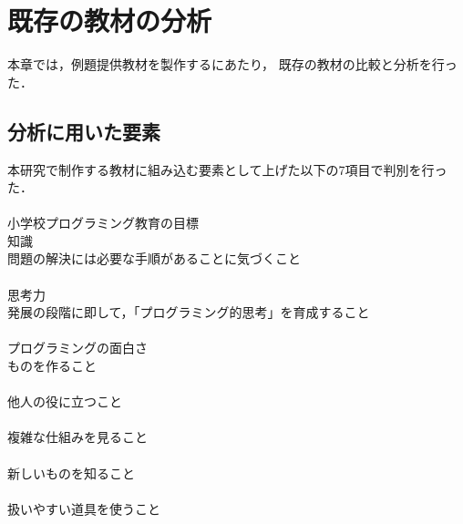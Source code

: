
\newpage

\section{\rm 既存の教材の分析}

本章では，例題提供教材を製作するにあたり， 既存の教材の比較と分析を行った．

\subsection{\rm 分析に用いた要素}
本研究で制作する教材に組み込む要素として上げた以下の7項目で判別を行った．\\\\
小学校プログラミング教育の目標\\
知識\\
問題の解決には必要な手順があることに気づくこと\\\\
思考力\\
発展の段階に即して，「プログラミング的思考」を育成すること\\\\
プログラミングの面白さ\\
ものを作ること\\\\
他人の役に立つこと\\\\
複雑な仕組みを見ること\\\\
新しいものを知ること\\\\
扱いやすい道具を使うこと\\



